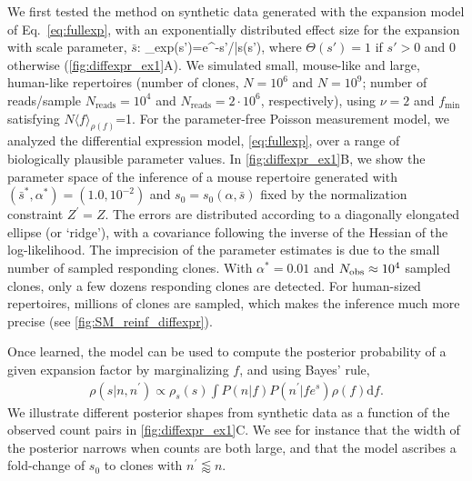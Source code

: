 We first tested the method on synthetic data generated with the expansion model of Eq.~\ref{eq:fullexp}, with an exponentially distributed effect size for the expansion with scale parameter, $\bar{s}$:
\beq\label{eq:onesidedexp}
\rho_{\rm exp}(s')=e^{-s'/\bar s}\Theta(s'),
\eeq
where $\Theta(s')=1$ if $s'>0$ and $0$ otherwise (\cref{fig:diffexpr_ex1}A).
We simulated small, mouse-like and large, human-like repertoires (number of clones, $N=10^6$ and $N=10^9$; number of reads/sample $N_{\textrm{reads}}=10^4$ and $N_{\textrm{reads}}=2\cdot 10^6$, respectively), using $\nu=2$ and $f_{\textrm{min}}$ satisfying $N\langle f\rangle_{\rho(f)}$=1. For the parameter-free Poisson measurement model, we analyzed the differential expression model, \cref{eq:fullexp}, over a range of biologically plausible parameter values.  
In \cref{fig:diffexpr_ex1}B, we show the parameter space of the inference of a mouse repertoire generated with $(\bar{s}^*,\alpha^* )=(1.0,10^{-2})$ and $s_0=s_0(\alpha,\bar s)$ fixed by the normalization constraint $Z^\prime=Z$. The errors are distributed according to a diagonally elongated ellipse (or `ridge'), with a covariance following the inverse of the Hessian of the log-likelihood.
The imprecision of the parameter estimates is due to the small number of sampled responding clones. With
$\alpha^*=0.01$ and $N_{\rm obs}\approx 10^4$ sampled clones, only a few dozens responding clones are detected. For human-sized repertoires, millions of clones are sampled, which makes the inference much more precise (see \cref{fig:SM_reinf_diffexpr}).

Once learned, the model can be used to compute the posterior probability of a given expansion factor by marginalizing $f$, and using Bayes' rule, 
\begin{align}\label{eq:post}
	\rho(s|n,n^{\prime})\propto \rho_s(s)\int P(n|f)P(n^{\prime}|fe^s)\rho(f)\textrm{d}f.
\end{align}
We illustrate different posterior shapes from synthetic data as a function of the observed count pairs in \cref{fig:diffexpr_ex1}C. We see for instance that the width of the posterior narrows when counts are both large, and that  the model ascribes a fold-change of $s_0$ to clones with $n^{\prime} \lessapprox n$.

